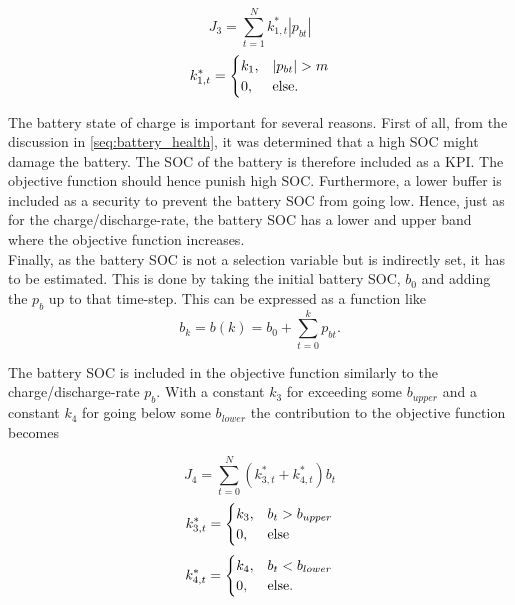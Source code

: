 \begin{equation}
    J_3 = \sum_{t=1}^{N}{k_{1,t}^*|p_{bt}|}
\end{equation}
\begin{equation}
    k_{1,t}^* =  \begin{cases}
            k_1,& |p_{bt}|>m\\
            0, & \text{else}.
            \end{cases}
            \notag
\end{equation}

The battery state of charge is important for several reasons. First of all, from the discussion in \ref{seq:battery_health}, it was determined that a high SOC might damage the battery. The SOC of the battery is therefore included as a KPI. The objective function should hence punish high SOC. Furthermore, a lower buffer is included as a security to prevent the battery SOC from going low. Hence, just as for the charge/discharge-rate, the battery SOC has a lower and upper band where the objective function increases.\\

Finally, as the battery SOC is not a selection variable but is indirectly set, it has to be estimated. This is done by taking the initial battery SOC, $b_0$ and adding the $p_b$ up to that time-step. This can be expressed as a function like
\begin{equation}
    b_k = b(k) = b_0 + \sum_{t=0}^{k}{p_{bt}} .
\end{equation}

The battery SOC is included in the objective function similarly to the charge/discharge-rate $p_b$. With a constant $k_3$ for exceeding some $b_{upper}$ and a constant $k_4$ for going below some $b_{lower}$ the contribution to the objective function becomes

\begin{equation}
    J_4 = \sum_{t=0}^{N}{(k_{3,t}^*+k_{4,t}^*)b_t }
\end{equation}
\begin{equation}
    k_{3,t}^* =  \begin{cases}
            k_3,& b_{t}>b_{upper}\\
            0, & \text{else}
            \end{cases}
            \notag
\end{equation}
\begin{equation}
    k_{4,t}^* =  \begin{cases}
            k_4,& b_{t}<b_{lower}\\
            0, & \text{else}.
            \end{cases}
            \notag
\end{equation}

